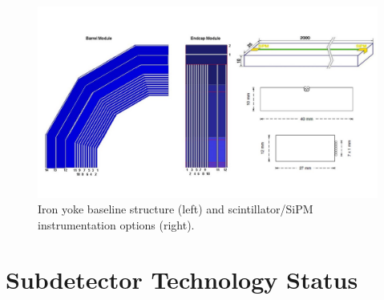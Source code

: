 
\begin{figure}[t!]
\centering
\includegraphics[width=1.0\hsize]{Detector/fig/Iron_instrumentation.jpg}
\caption{Iron yoke baseline structure (left) and scintillator/SiPM instrumentation options (right).}
\label{fig:det:yoke}
\end{figure}

\newpage
\section{Subdetector Technology Status}
\label{sec:subdetectors}


